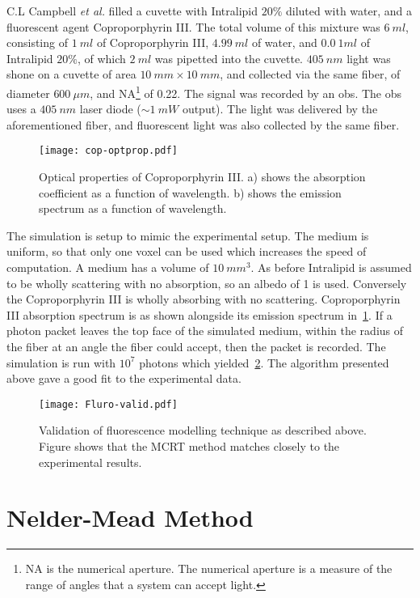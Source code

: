 C.L Campbell \textit{et al.} filled a cuvette with Intralipid $20\%$ diluted with water, and a fluorescent agent Coproporphyrin III\@.
The total volume of this mixture was $6~ml$, consisting of $1~ml$ of Coproporphyrin III, $4.99~ml$ of water, and $0.0~1ml$ of Intralipid $20\%$, of which $2~ml$ was pipetted into the cuvette.
$405~nm$ light was shone on a cuvette of area $10~mm \times 10~mm$, and collected via the same fiber, of diameter $600~\mu m$, and NA\footnote{NA is the numerical aperture. The numerical aperture is a measure of the range of angles that a system can accept light.} of 0.22.
The signal was recorded by an \gls*{obs}.
The \gls*{obs} uses a $405~nm$ laser diode ($\sim1~mW$ output).
The light was delivered by the aforementioned fiber, and fluorescent light was also collected by the same fiber.


\begin{figure}[!htpb]
	\centering
	\texttt{[image: cop-optprop.pdf]}
	\caption{Optical properties of Coproporphyrin III. a) shows the absorption coefficient as a function of wavelength. b) shows the emission spectrum as a function of wavelength.}
	\label{fig:coporiii}
\end{figure}

The simulation is setup to mimic the experimental setup.
The medium is uniform, so that only one voxel can be used which increases the speed of computation.
A medium has a volume of $10~mm^3$.
As before Intralipid is assumed to be wholly scattering with no absorption, so an albedo of 1 is used.
Conversely the Coproporphyrin III is wholly absorbing with no scattering.
Coproporphyrin III absorption spectrum is as shown alongside its emission spectrum in~\cref{fig:coporiii}.
If a photon packet leaves the top face of the simulated medium, within the radius of the fiber at an angle the fiber could accept, then the packet is recorded.
The simulation is run with $10^7$ photons which yielded~\cref{fig:flurovalid}.
The algorithm presented above gave a good fit to the experimental data.

\begin{figure}[!htpb]
  \centering
  \texttt{[image: Fluro-valid.pdf]}
  \caption{Validation of fluorescence modelling technique as described above. Figure shows that the MCRT method matches closely to the experimental results.}
  \label{fig:flurovalid}
\end{figure}

\FloatBarrier

\section{Nelder-Mead Method}

